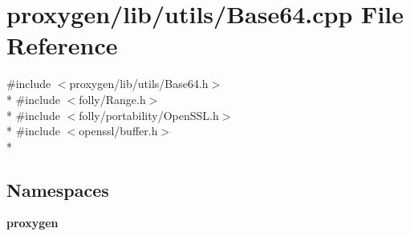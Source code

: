\section{proxygen/lib/utils/\+Base64.cpp File Reference}
\label{Base64_8cpp}
{\ttfamily \#include $<$proxygen/lib/utils/\+Base64.\+h$>$}\\*
{\ttfamily \#include $<$folly/\+Range.\+h$>$}\\*
{\ttfamily \#include $<$folly/portability/\+Open\+S\+S\+L.\+h$>$}\\*
{\ttfamily \#include $<$openssl/buffer.\+h$>$}\\*
\subsection*{Namespaces}
\begin{DoxyCompactItemize}
\item 
 {\bf proxygen}
\end{DoxyCompactItemize}
